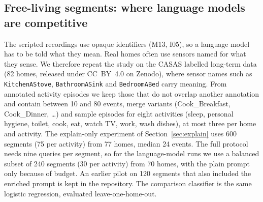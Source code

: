 \documentclass[11pt,a4paper]{article}
\begin{document}
\subsection{Free-living segments: where language models are competitive}
\label{sec:home}
The scripted recordings use opaque identifiers (M13, I05), so a language model has to be told what they mean. Real homes often use sensors named for what they sense. We therefore repeat the study on the CASAS labelled long-term data (82 homes, released under CC~BY~4.0 on Zenodo), where sensor names such as \texttt{KitchenAStove}, \texttt{BathroomASink} and \texttt{BedroomABed} carry meaning. From annotated activity episodes we keep those that do not overlap another annotation and contain between 10 and 80 events, merge variants (Cook\_Breakfast, Cook\_Dinner, \dots) and sample episodes for eight activities (sleep, personal hygiene, toilet, cook, eat, watch TV, work, wash dishes), at most three per home and activity. The explain-only experiment of Section~\ref{sec:explain} uses 600 segments (75 per activity) from 77 homes, median 24 events. The full protocol needs nine queries per segment, so for the language-model runs we use a balanced subset of 240 segments (30 per activity) from 70 homes, with the plain prompt only because of budget. An earlier pilot on 120 segments that also included the enriched prompt is kept in the repository. The comparison classifier is the same logistic regression, evaluated leave-one-home-out.

\begin{table}[t]
\centering
\footnotesize
\setlength{\tabcolsep}{4pt}

\caption{Free-living segments (240 segments from 70 homes, eight activities, plain prompt). The trained classifier is evaluated leave-one-home-out on the same segments. Level: authority level from Section~\ref{sec:ladder}, with $F_{\mathrm{ref}}=\HomeRefF$ measured for the faithful reference on the 600-segment set.}
\label{tab:home}
\end{table}
\end{document}
